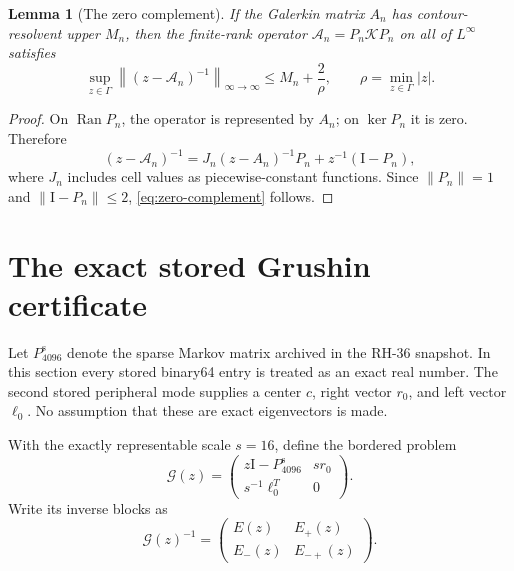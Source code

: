 \documentclass[11pt]{article}
\newtheorem{lemma}[theorem]{Lemma}
\theoremstyle{definition}
\theoremstyle{remark}
\newcommand{\Id}{\mathrm I}
\newcommand{\cA}{\mathcal A}
\newcommand{\cK}{\mathcal K}
\newcommand{\cG}{\mathcal G}
\newcommand{\norm}[1]{\left\lVert #1\right\rVert}
\newcommand{\Ran}{\operatorname{Ran}}
\begin{document}
\begin{lemma}[The zero complement]
\label{lem:zero-complement}
If the Galerkin matrix $A_n$ has contour-resolvent upper $M_n$, then the
finite-rank operator $\cA_n=P_n\cK P_n$ on all of $L^\infty$ satisfies
\begin{equation}
 \sup_{z\in\Gamma}\norm{(z-\cA_n)^{-1}}_{\infty\to\infty}
 \le M_n+\frac2{\rho},
 \qquad
 \rho=\min_{z\in\Gamma}|z|.
 \label{eq:zero-complement}
\end{equation}
\end{lemma}

\begin{proof}
On $\Ran P_n$, the operator is represented by $A_n$; on $\ker P_n$ it is
zero.  Therefore
\[
 (z-\cA_n)^{-1}
 =J_n(z-A_n)^{-1}P_n+z^{-1}(\Id-P_n),
\]
where $J_n$ includes cell values as piecewise-constant functions.  Since
$\norm{P_n}=1$ and $\norm{\Id-P_n}\le2$, \eqref{eq:zero-complement}
follows.
\end{proof}

\section{The exact stored Grushin certificate}
\label{sec:grushin}

Let $P^{\mathrm s}_{4096}$ denote the sparse Markov matrix archived in the
RH-36 snapshot.  In this section every stored binary64 entry is treated as
an exact real number.  The second stored peripheral mode supplies a center
$c$, right vector $r_0$, and left vector $\ell_0$.  No assumption that these
are exact eigenvectors is made.

With the exactly representable scale $s=16$, define the bordered problem
\begin{equation}
 \cG(z)=
 \begin{pmatrix}
 z\Id-P^{\mathrm s}_{4096}&s r_0\\
 s^{-1}\ell_0^T&0
 \end{pmatrix}.
 \label{eq:grushin}
\end{equation}
Write its inverse blocks as
\[
 \cG(z)^{-1}
 =
 \begin{pmatrix}
 E(z)&E_+(z)\\
 E_-(z)&E_{-+}(z)
 \end{pmatrix}.
\]
\end{document}
